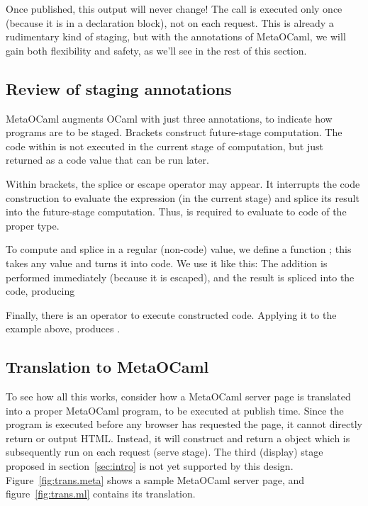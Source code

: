 \documentclass{elsart}
\def\MOC{MetaOCaml\xspace}
\begin{document}
Once published, this output will never change!  The  call is
executed only once (because it is in a declaration block), not on each
request.  This is already a rudimentary kind of staging, but with the
annotations of \MOC, we will gain both flexibility and safety, as
we'll see in the rest of this section.

\subsection{Review of staging annotations}

\MOC augments OCaml with just three annotations, to indicate how
programs are to be staged.  Brackets 
construct future-stage computation.  The code within is not executed
in the current stage of computation, but just returned as a code value
that can be run later.

Within brackets, the splice or escape operator  may
appear.  It interrupts the code construction to evaluate the expression
 (in the current stage) and splice its result into the
future-stage computation.  Thus,  is required to evaluate to code of
the proper type.

To compute and splice in a regular (non-code) value, we define a
function ; this
takes any value and turns it into code.  We use it like this:
 The addition is
performed immediately (because it is escaped), and the result is
spliced into the code, producing 

Finally, there is an operator \Mrun{} to execute constructed code.
Applying it to the example above,  produces .


\subsection{Translation to \MOC}
To see how all this works, consider how a \MOC server
page is translated into a proper \MOC program, to be executed
at publish time.  Since the program is executed before any
browser has requested the page, it cannot directly return or
output HTML.  Instead, it will construct and return a 
object which is subsequently run on each request (serve stage).
The third (display) stage proposed in section~\ref{sec:intro} is not
yet supported by this design.
Figure~\ref{fig:trans.meta} shows a sample \MOC server page,
and figure~\ref{fig:trans.ml} contains its translation.
\end{document}
